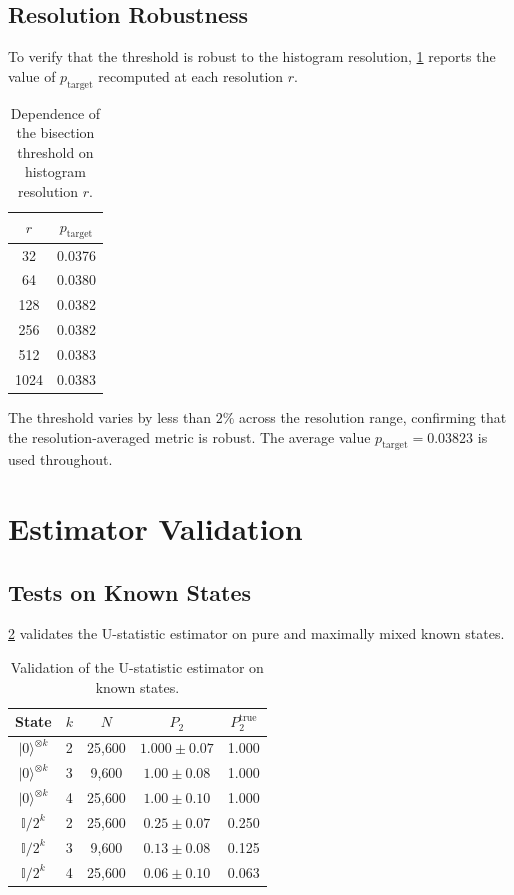 \documentclass[12pt,a4paper,oneside]{book}
\theoremstyle{plain}
\theoremstyle{definition}
\theoremstyle{remark}
\begin{document}
\subsection{Resolution Robustness}

To verify that the threshold is robust to the histogram resolution, \cref{tab:resolution} reports the value of $p_{\text{target}}$ recomputed at each resolution $r$.

\begin{table}[H]
\centering
\caption{Dependence of the bisection threshold on histogram resolution $r$.}
\label{tab:resolution}
\begin{tabular}{c|c}
\toprule
$r$ & $p_{\text{target}}$ \\
\midrule
32    & 0.0376 \\
64    & 0.0380 \\
128   & 0.0382 \\
256   & 0.0382 \\
512   & 0.0383 \\
1024  & 0.0383 \\
\bottomrule
\end{tabular}
\end{table}

The threshold varies by less than $2\%$ across the resolution range, confirming that the resolution-averaged metric is robust. The average value $p_{\text{target}} = 0.03823$ is used throughout.

\section{Estimator Validation}
\label{sec:results_estimator}

\subsection{Tests on Known States}

\cref{tab:estimator_validation} validates the U-statistic estimator on pure and maximally mixed known states.

\begin{table}[H]
\centering
\caption{Validation of the U-statistic estimator on known states.}
\label{tab:estimator_validation}
\begin{tabular}{c|c|c|c|c}
\toprule
State & $k$ & $N$ & $\widehat{P}_2$ & $P_2^{\text{true}}$ \\
\midrule
$|0\rangle^{\otimes k}$ & 2 & 25{,}600 & $1.000 \pm 0.07$ & 1.000 \\
$|0\rangle^{\otimes k}$ & 3 & 9{,}600  & $1.00 \pm 0.08$  & 1.000 \\
$|0\rangle^{\otimes k}$ & 4 & 25{,}600 & $1.00 \pm 0.10$  & 1.000 \\
$\mathbb{I}/2^k$ & 2 & 25{,}600 & $0.25 \pm 0.07$  & 0.250 \\
$\mathbb{I}/2^k$ & 3 & 9{,}600  & $0.13 \pm 0.08$  & 0.125 \\
$\mathbb{I}/2^k$ & 4 & 25{,}600 & $0.06 \pm 0.10$  & 0.063 \\
\bottomrule
\end{tabular}
\end{table}
\end{document}
